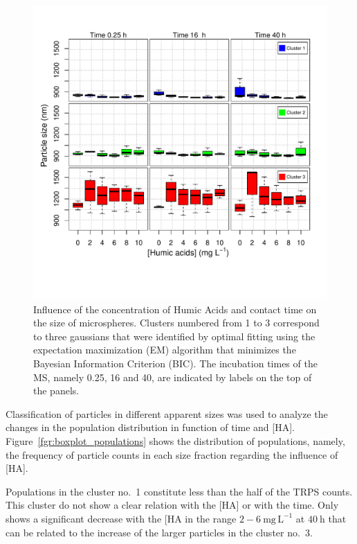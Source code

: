 \documentclass[journal=langd5,manuscript=article]{achemso}
\begin{document}
 \begin{figure}
  \includegraphics[width=\linewidth]{Figures/Boxplot_MS_HA_CaCl2_sizes_rev.pdf}
  \caption{Influence of the concentration of Humic Acids and contact time on the  size of microspheres.  Clusters numbered from 1 to 3 correspond to three gaussians that were identified by optimal fitting using the expectation maximization (EM) algorithm  that minimizes the Bayesian Information Criterion (BIC). The incubation times of the MS,  namely 0.25, 16 and 40, are indicated by labels on the top of the panels.}
  \label{fgr:boxplot_size}
\end{figure}


Classification of particles in different apparent sizes was used to analyze the changes in the population distribution in function of time and [HA]. Figure~\ref{fgr:boxplot_populations} shows the distribution of populations, namely, the frequency of particle counts in each size fraction regarding the influence of [HA].

Populations in the cluster no.~1 constitute less than the half of the TRPS counts. This cluster do not show a clear relation with the [HA] or with the time. Only  shows a  significant decrease with the [HA in the range $2-6~\mathrm{mg\,L^{-1}}$ at $40~\mathrm{h}$ that can be related to the increase of the larger particles in the cluster no.~3.
\end{document}
